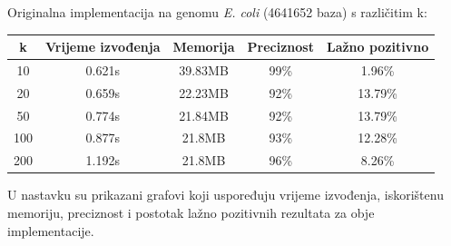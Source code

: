 \documentclass[seminarskirad]{fer}
\begin{document}
Originalna implementacija na genomu \textit{E. coli} (4641652 baza) s različitim k:

\begin{center}
	\small
	\begin{tabular}{||c c c c c||} 
		\hline
		k & Vrijeme izvođenja & Memorija & Preciznost & Lažno pozitivno \\ [0.5ex] 
		\hline\hline
		10 & 0.621s & 39.83MB & 99\% & 1.96\% \\ 
		\hline
		20 & 0.659s & 22.23MB & 92\% & 13.79\% \\
		\hline
		50 & 0.774s & 21.84MB & 92\% & 13.79\% \\
		\hline
		100 & 0.877s & 21.8MB & 93\% & 12.28\% \\
		\hline
		200 & 1.192s & 21.8MB & 96\% & 8.26\% \\ [1ex] 
		\hline
	\end{tabular}
\end{center}

U nastavku su prikazani grafovi koji uspoređuju vrijeme izvođenja, iskorištenu memoriju, preciznost i postotak lažno pozitivnih rezultata za obje implementacije.
\end{document}
